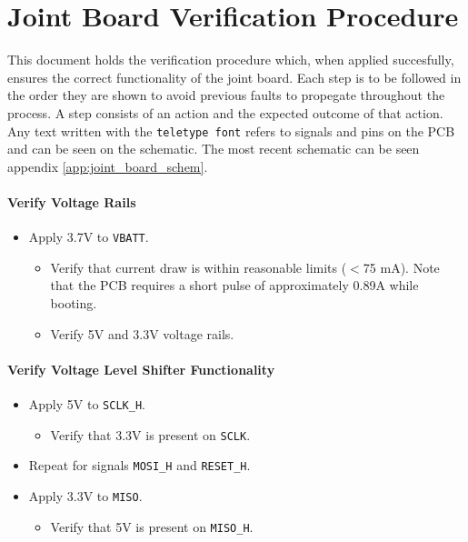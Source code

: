 \section{Joint Board Verification Procedure} %
\label{sec:joint_board_verification_procedure}
This document holds the verification procedure which, when applied succesfully, ensures the correct functionality of the joint board.
Each step is to be followed in the order they are shown to avoid previous faults to propegate throughout the process.
A step consists of an action and the expected outcome of that action.
Any text written with the \texttt{teletype font} refers to signals and pins on the PCB and can be seen on the schematic.
The most recent schematic can be seen appendix \ref{app:joint_board_schem}.

\paragraph{Verify Voltage Rails} %
 \label{par:verify_voltage_rails}
 \begin{itemize}
 	\item Apply 3.7V to \texttt{VBATT}.
 	\begin{itemize}
 		\item Verify that current draw is within reasonable limits ($<$75 mA). Note that the PCB requires a short pulse of approximately 0.89A while booting.
 		\item Verify 5V and 3.3V voltage rails.
 	\end{itemize}
 \end{itemize}

\paragraph{Verify Voltage Level Shifter Functionality} %
\label{par:verify_voltage_level_shifter_functionality}
\begin{itemize}
	\item Apply 5V to \texttt{SCLK\_H}.
	\begin{itemize}
		\item  Verify that 3.3V is present on \texttt{SCLK}.
	\end{itemize}
	\item Repeat for signals \texttt{MOSI\_H} and \texttt{RESET\_H}.
	\item Apply 3.3V to \texttt{MISO}.
	\begin{itemize}
		\item  Verify that 5V is present on \texttt{MISO\_H}.
	\end{itemize}
\end{itemize}

